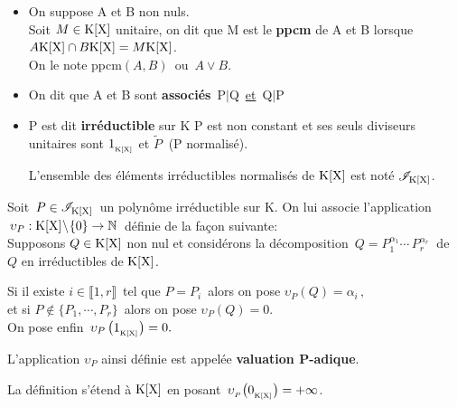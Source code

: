 \begin{itemize}[leftmargin=0.5cm, label=•]
    \item On suppose A et B non nuls.\\
    Soit $M\in \text{K}[\text{X}]$ unitaire, on dit que M est le \textbf{ppcm} de A et B lorsque \(A\text{K}[\text{X}]\cap B\text{K}[\text{X}]=M\text{K}[\text{X}]\).\\
    On le note ppcm$(A,B)\,$ ou $\,A\lor B$.

    \item On dit que A et B sont \textbf{associés} \ssi \,P$\mid$Q\, \underline{et}\, Q$\mid$P

    \item P est dit \textbf{irréductible} sur K \ssi P est non constant et ses seuls diviseurs unitaires sont $1_{_{\text{K}[\text{X}]}}$ et $\tilde{P}\:$ (P normalisé).\\ \begin{small}L'ensemble des éléments irréductibles normalisés de $\text{K}[\text{X}]$ est noté $\mathscr{I}_{\text{K}[\text{X}]}$.\end{small}

\end{itemize}

\vspace{1cm}

\noindent Soit $\,P\in \mathscr{I}_{\text{K}[\text{X}]}\,$ un polynôme irréductible sur K. On lui associe l'application \(\,\upsilon_P :\text{K}[\text{X}]\!\setminus\!\{0\} \to \mathbb{N}\,\) définie de la façon suivante:\vspace{0.2cm}\\
Supposons $Q\in \text{K}[\text{X}]$ non nul et considérons la décomposition \(\,Q=P_1^{\alpha_1}\cdots\, P_r^{\alpha_r}\:\) de $Q$ en irréductibles de $\text{K}[\text{X}]$.\vspace{-0.4cm}
\begin{center}
Si il existe \(i\in \llbracket 1,r \rrbracket\,\) tel que $P=P_i\,$ alors on pose $\upsilon_P(Q)=\alpha_i\,,$\vspace{0.1cm}\\
et si \(P\notin \{P_1,\cdots,P_r\}\,\) alors on pose $\upsilon_P(Q)=0.$\vspace{0.1cm}\\
On pose enfin $\,\upsilon_P\,\bigl(1_{_{\text{K}[\text{X}]}}\bigr)=0.$
\end{center}
L'application $\upsilon_P$ ainsi définie est appelée \textbf{valuation P-adique}.\vspace{0.1cm}\\
\begin{small}
    La définition s'étend à $\text{K}[\text{X}]$ en posant $\,\upsilon_{_P}\bigl(0_{_{\text{K}[\text{X}]}}\bigr)=+\infty$.
\end{small}


